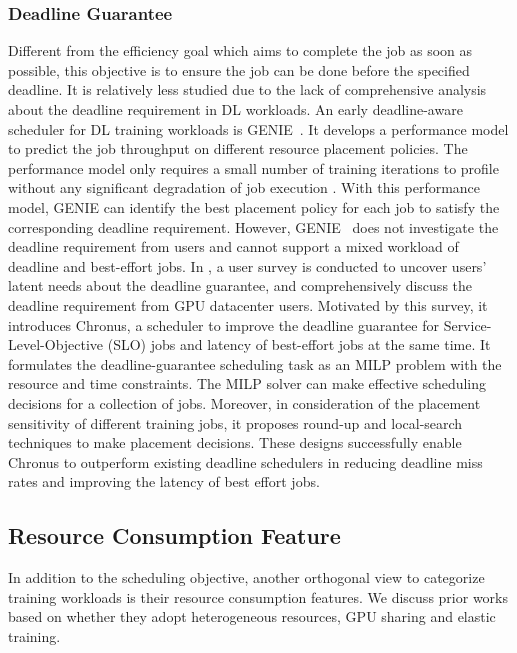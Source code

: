 \subsubsection{Deadline Guarantee}
Different from the efficiency goal which aims to complete the job as soon as possible, this objective is to ensure the job can be done before the specified deadline. It is relatively less studied due to the lack of comprehensive analysis about the deadline requirement in DL workloads. An early deadline-aware scheduler for DL training workloads is GENIE~\cite{GENIE}.
It develops a performance model to predict the job throughput on different resource placement policies. The performance model only requires a small number of training iterations to profile without any significant degradation of job execution {\tiny{}}. With this performance model, GENIE can identify the best placement policy for each job to satisfy the corresponding deadline requirement. However, GENIE~\cite{GENIE} does not investigate the deadline requirement from users and cannot support a mixed workload of deadline and best-effort jobs. In \cite{Chronus}, a user survey is conducted to uncover users' latent needs about the deadline guarantee, and comprehensively discuss the deadline requirement from GPU datacenter users. Motivated by this survey, it introduces Chronus, a scheduler to improve the deadline guarantee for Service-Level-Objective (SLO) jobs and latency of best-effort jobs at the same time. It formulates the deadline-guarantee scheduling task as an MILP problem with the resource and time constraints. The MILP solver can make effective scheduling decisions for a collection of jobs. Moreover, in consideration of the placement sensitivity of different training jobs, it proposes round-up and local-search techniques to make placement decisions. These designs successfully enable Chronus to outperform existing deadline schedulers in reducing deadline miss rates and improving the latency of best effort jobs.




\subsection{Resource Consumption Feature}
\label{sec_training_resource}
In addition to the scheduling objective, another orthogonal view to categorize training workloads is their resource consumption features. We discuss prior works based on whether they adopt heterogeneous resources, GPU sharing and elastic training.



